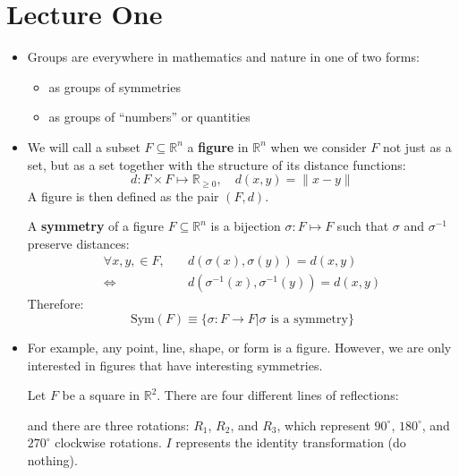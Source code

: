 \section{Lecture One}
\begin{itemize}
    \item Groups are everywhere in mathematics and nature in one of two forms:
    \begin{itemize}
        \item as groups of symmetries
        \item as groups of ``numbers'' or quantities
    \end{itemize}
    \item We will call a subset $F \subseteq \mathbb{R}^n$ a \textbf{figure} in $\mathbb{R}^n$ when we consider $F$ not just as a set, but as a set together with the structure of its distance functions:
    \begin{equation}
        d: F \times F \mapsto \mathbb{R}_{\ge 0},\quad d(x,y) = \lVert x-y \rVert
    \end{equation}
    A figure is then defined as the pair $(F,d)$.
    \begin{definition}
        A \textbf{symmetry} of a figure $F \subseteq \mathbb{R}^n$ is a bijection $\sigma: F \mapsto F$ such that $\sigma$ and $\sigma^{-1}$ preserve distances:
        \begin{align}
            \forall x,y, \in F,\quad& d(\sigma(x),\sigma(y))=d(x,y) \\ 
            \iff & d(\sigma^{-1}(x), \sigma^{-1}(y)) = d(x,y)
        \end{align}
        Therefore:
        \begin{equation}
            \text{Sym}(F) \equiv \{\sigma: F\to F | \sigma\text{ is a symmetry}\}
        \end{equation}
    \end{definition}
    \item For example, any point, line, shape, or form is a figure. However, we are only interested in figures that have interesting symmetries.
    \begin{example}
        Let $F$ be a square in $\mathbb{R}^2$. There are four different lines of reflections:
        \begin{center}
        \end{center}
        and there are three rotations: $R_1$, $R_2$, and $R_3$, which represent $90^\circ$, $180^\circ$, and $270^\circ$ clockwise rotations. $I$ represents the identity transformation (do nothing).
        \vspace{2mm}


\end{example}
\end{itemize}
